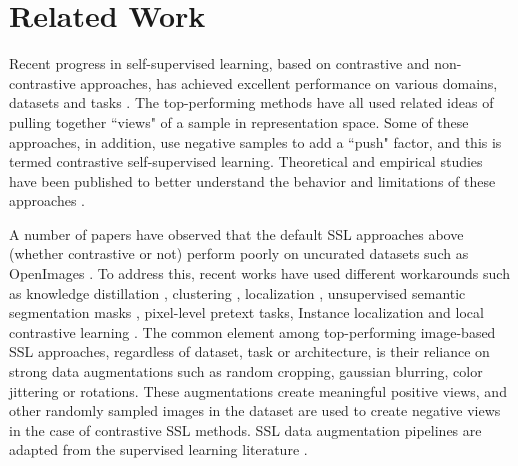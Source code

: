 \section{Related Work}
\vspace{-5pt}
\label{secc:related}
Recent progress in self-supervised learning, based on contrastive and non-contrastive approaches, has achieved excellent performance on various domains, datasets and tasks \citep{he2019momentum,chen2020improved,chen2020simple,Oord2018RepresentationLW,tian2019contrastive,gidaris2020learning,misra2019selfsupervised,NEURIPS2020_4c2e5eaa,8578491,grill2020bootstrap,Gidaris2018UnsupervisedRL,Larsson2017ColorizationAA,Noroozi_2018_CVPR,Pathak2016ContextEF}. The top-performing methods have all used related ideas of pulling together ``views" of a sample in representation space. Some of these approaches, in addition, use negative samples to add a ``push" factor, and this is termed contrastive self-supervised learning. Theoretical and empirical studies have been published to better understand the behavior and limitations of these approaches  \citep{arora2019theoretical,xiao2021contrastive,purushwalkam2020demystifying,tosh2021contrastive,wang2020understanding,yang2020xlnet,NEURIPS2020_63c3ddcc,liu2021selfsupervised,kalantidis2020hard,Newell_2020,cai2020negatives}. 

A number of papers have observed that the default SSL approaches above (whether contrastive or not) perform poorly on uncurated datasets such as OpenImages \citep{kuznetsova2020open}. To address this, recent works have used different workarounds such as knowledge distillation \citep{tian2021divide}, clustering \citep{goyal2021selfsupervised}, localization \citep{selvaraju2020casting}, unsupervised semantic segmentation masks \citep{henaff2021efficient}, pixel-level pretext tasks\citep{xie2021propagate}, Instance localization \citep{yang2021instance} and local contrastive learning \citep{liu2021selfemd}. The common element among top-performing image-based SSL approaches, regardless of dataset, task or architecture, is their reliance on strong data augmentations such as random cropping, gaussian blurring, color jittering or rotations. These augmentations create meaningful positive views, and other randomly sampled images in the dataset are used to create negative views in the case of contrastive SSL methods. SSL data augmentation pipelines are adapted from the supervised learning literature \citep{cubuk2019autoaugment,zoph2020rethinking,NIPS2012_c399862d,2003aug,devries2017dataset,cubuk2019autoaugment,zhang2018mixup,cubuk2019randaugment,wu2019detectron2,yun2019cutmix,lim2019fast,hataya2019faster}.

